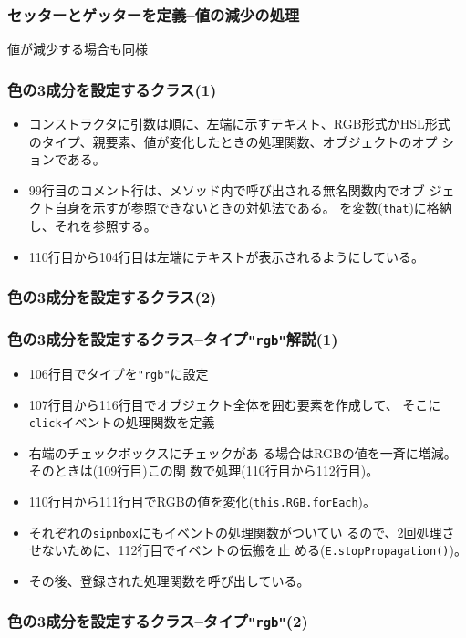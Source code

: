  \begin{frame}[containsverbatim]
  \frametitle{セッターとゲッターを定義--値の減少の処理}
  値が減少する場合も同様
 \end{frame}
 \begin{frame}[containsverbatim]
  \frametitle{色の3成分を設定するクラス(1)}
 \begin{itemize}
 \item コンストラクタに引数は順に、左端に示すテキスト、RGB形式かHSL形式
			 のタイプ、親要素、値が変化したときの処理関数、オブジェクトのオプ
			 ションである。
 \item 99行目のコメント行は、メソッド内で呼び出される無名関数内でオブ
			 ジェクト自身を示すが参照できないときの対処法である。
			 を変数(\texttt{that})に格納し、それを参照する。
 \item 110行目から104行目は左端にテキストが表示されるようにしている。
 \end{itemize}
 \end{frame}
 \begin{frame}[containsverbatim]
  \frametitle{色の3成分を設定するクラス(2)}
\end{frame}
 \begin{frame}[containsverbatim]
  \frametitle{色の3成分を設定するクラス--タイプ\texttt{"rgb"}解説(1)}
			 \begin{itemize}
				\item 106行目でタイプを\texttt{"rgb"}に設定
				\item 107行目から116行目でオブジェクト全体を囲む要素を作成して、
							そこに\texttt{click}イベントの処理関数を定義
				\item 右端のチェックボックスにチェックがあ
							る場合はRGBの値を一斉に増減。そのときは(109行目)この関
							数で処理(110行目から112行目)。
				\item 110行目から111行目でRGBの値を変化(\texttt{this.RGB.forEach})。
				\item それぞれの\texttt{sipnbox}にもイベントの処理関数がついてい
							るので、2回処理させないために、112行目でイベントの伝搬を止
							める(\texttt{E.stopPropagation()})。
				\item その後、登録された処理関数を呼び出している。
			 \end{itemize}
 \end{frame}
 \begin{frame}[containsverbatim]
  \frametitle{色の3成分を設定するクラス--タイプ\texttt{"rgb"}(2)}
\end{frame}
